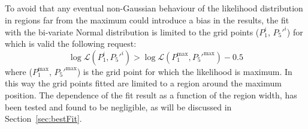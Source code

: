 To avoid that any eventual non-Gaussian behaviour of the likelihood distribution in regions far from the maximum could introduce a bias in the results, the fit with the bi-variate Normal distribution is limited to the grid points ($P_1^i$, $P_5'^i$) for which is valid the following request: $$\log\mathcal{L}(P_1^i,P_5'^i) > \log\mathcal{L}(P_1^{\mathrm{max}},P_5'^{\mathrm{max}}) - 0.5$$ where ($P_1^{\mathrm{max}}$, $P_5'^{\mathrm{max}}$) is the grid point for which the likelihood is maximum.
In this way the grid points fitted are limited to a region around the maximum position.
The dependence of the fit result as a function of the region width, has been tested and found to be negligible, as will be discussed in Section~\ref{sec:bestFit}.







